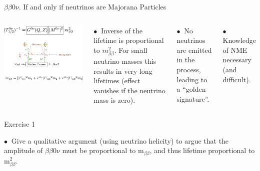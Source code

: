 \documentclass [aspectratio=169]{beamer}
\begin{document}
\begin{frame}{$\beta\beta0\nu$. If and only if neutrinos are Majorana Particles}

\begin{columns}
\includegraphics[scale=0.25]{bb0nu.png}

$\bullet~$ Inverse of the lifetime is proportional to $m_{\beta\beta}^2$. For small neutrino masses this results in very long lifetimes (effect vanishes if the neutrino mass is zero). 

$\bullet~$ No neutrinos are emitted in the process, leading to a ``golden signature''.

$\bullet~$ Knowledge of NME necessary (and difficult).
 
\end{columns}
\end{frame}

\begin{frame}{Exercise 1}

$\bullet~$ Give a qualitative argument (using neutrino helicity) to argue that the amplitude of  $\beta\beta0\nu$ must be proportional to m$_{\beta\beta}$, and thus lifetime proportional to m$_{\beta\beta}^2$.
\end{frame}

\end{document}
